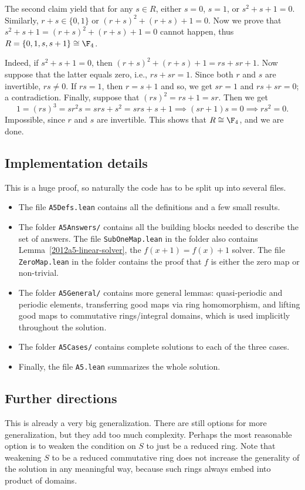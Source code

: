 The second claim yield that for any $s \in R$, either $s = 0$, $s = 1$, or $s^2 + s + 1 = 0$.
Similarly, $r + s \in \{0, 1\}$ or $(r + s)^2 + (r + s) + 1 = 0$.
Now we prove that $s^2 + s + 1 = (r + s)^2 + (r + s) + 1 = 0$ cannot happen, thus $R = \{0, 1, s, s + 1\} \cong \F_4$.

Indeed, if $s^2 + s + 1 = 0$, then $(r + s)^2 + (r + s) + 1 = rs + sr + 1$.
Now suppose that the latter equals zero, i.e., $rs + sr = 1$.
Since both $r$ and $s$ are invertible, $rs \neq 0$.
If $rs = 1$, then $r = s + 1$ and so, we get $sr = 1$ and $rs + sr = 0$; a contradiction.
Finally, suppose that $(rs)^2 = rs + 1 = sr$.
Then we get
\[ 1 = (rs)^3 = sr^2 s = srs + s^2 = srs + s + 1 \implies (sr + 1) s = 0 \implies rs^2 = 0. \]
Impossible, since $r$ and $s$ are invertible.
This shows that $R \cong \F_4$, and we are done.



\subsection*{Implementation details}

This is a huge proof, so naturally the code has to be split up into several files.
\begin{itemize}
    \item   The file \texttt{A5Defs.lean} contains all the definitions and a few small results.
    \item   The folder \texttt{A5Answers/} contains all the building blocks needed to describe the set of answers.
            The file \texttt{SubOneMap.lean} in the folder also contains Lemma~\ref{2012a5-linear-solver}, the $f(x + 1) = f(x) + 1$ solver.
            The file \texttt{ZeroMap.lean} in the folder contains the proof that $f$ is either the zero map or non-trivial.
    \item   The folder \texttt{A5General/} contains more general lemmas: quasi-periodic and periodic elements, transferring good maps via ring homomorphism, and lifting good maps to commutative rings/integral domains, which is used implicitly throughout the solution.
    \item   The folder \texttt{A5Cases/} contains complete solutions to each of the three cases.
    \item   Finally, the file \texttt{A5.lean} summarizes the whole solution.
\end{itemize}



\subsection*{Further directions}

This is already a very big generalization.
There are still options for more generalization, but they add too much complexity.
Perhaps the most reasonable option is to weaken the condition on $S$ to just be a reduced ring.
Note that weakening $S$ to be a reduced commutative ring does not increase the generality of the solution in any meaningful way, because such rings always embed into product of domains.
